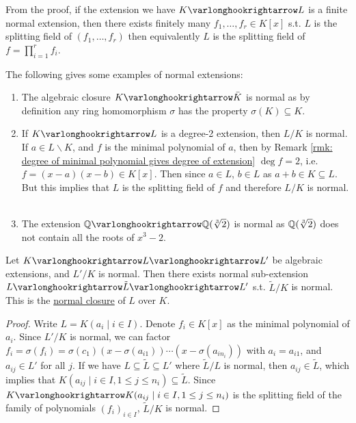 \documentclass{article}
\begin{document}
\begin{remark}
    From the proof, if the extension we have $K \ext L$ is a finite normal extension, then there exists finitely many $f_1, \dots, f_r \in K[x]$ s.t. $L$ is the splitting field of $(f_1, \dots, f_r)$ then equivalently $L$ is the splitting field of $f = \prod_{i = 1}^r f_i$.
\end{remark}

\begin{example}
    The following gives some examples of normal extensions:
    \begin{enumerate}
        \item The algebraic closure $K \ext \bar{K}$ is normal as by definition any ring homomorphism $\sigma$ has the property $\sigma(K) \subseteq K$.
        \item If $K \ext L$ is a degree-2 extension, then $L/K$ is normal. If $a \in L \smallsetminus K$, and $f$ is the minimal polynomial of $a$, then by Remark \ref{rmk: degree of minimal polynomial gives degree of extension} $\deg f = 2$, i.e. $f = (x-a)(x-b) \in K[x]$. Then since $a \in L$, $b \in L$ as $a + b \in K \subseteq L$. But this implies that $L$ is the splitting field of $f$ and therefore $L/K$ is normal. \
        \item The extension $\Q \ext \Q(\sqrt[3]{2})$ is normal as $\mathbb{Q}(\sqrt[3]{2})$ does not contain all the roots of $x^3 - 2$.
    \end{enumerate}
\end{example}

\begin{proposition}
    Let $K \ext L \ext L'$ be algebraic extensions, and $L'/K$ is normal. Then there exists normal sub-extension $L \ext \tilde{L} \ext L'$ s.t. $\tilde{L}/K$ is normal. This is the \underline{normal closure} of $L$ over $K$.
\end{proposition}

\begin{proof}
    Write $L = K(a_i \mid i \in I)$. Denote $f_i \in K[x]$ as the minimal polynomial of $a_i$. Since $L'/K$ is normal, we can factor $f_i = \sigma(f_i) = \sigma(c_1) (x - \sigma(a_{i1})) \cdots (x - \sigma(a_{i n_i}))$ with $a_i = a_{i1}$, and $a_{ij} \in L'$ for all $j$. If we have $L \subseteq \tilde{L} \subseteq L'$ where $\tilde{L}/L$ is normal, then $a_{ij} \in \tilde{L}$, which implies that $K(a_{ij} \mid i \in I, 1 \leq j \leq n_i) \subseteq \tilde{L}$. Since $K \ext K(a_{ij} \mid i \in I, 1 \leq j \leq n_i)$ is the splitting field of the family of polynomials $(f_i)_{i \in I}$, $\tilde{L}/K$ is normal.
\end{proof}
\end{document}
